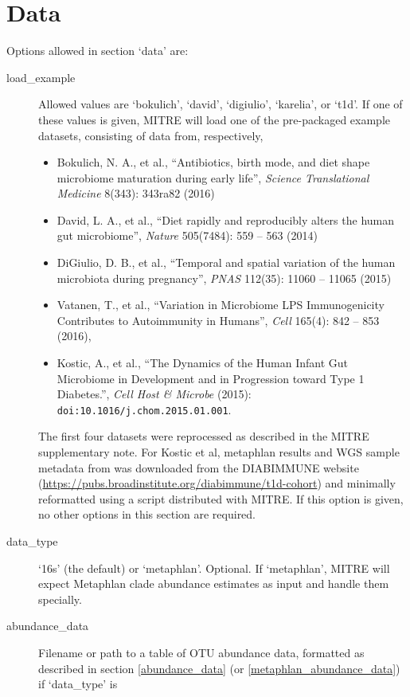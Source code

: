 \documentclass[12pt]{report}
\begin{document}
\section{Data}\label{data}
Options allowed in section `data' are:
\begin{description}
\item[load\_example] Allowed values are `bokulich', `david',
  `digiulio', `karelia', or `t1d'. If one of these values is given,
  MITRE will load one of the pre-packaged example datasets, consisting
  of data from, respectively, \begin{itemize}
  \item Bokulich, N. A., et al., ``Antibiotics, birth mode, and diet
    shape microbiome maturation during early life'', \textit{Science
      Translational Medicine} 8(343): 343ra82 (2016)
  \item David, L. A., et al., ``Diet rapidly and reproducibly alters
    the human gut microbiome'', \textit{Nature} 505(7484): 559 -- 563
    (2014)
  \item DiGiulio, D. B., et al., ``Temporal and spatial variation of
    the human microbiota during pregnancy'', \textit{PNAS} 112(35):
    11060 -- 11065 (2015)
  \item Vatanen, T., et al., ``Variation in Microbiome LPS
    Immunogenicity Contributes to Autoimmunity in Humans'',
    \textit{Cell} 165(4): 842 -- 853 (2016),
  \item Kostic, A., et al., ``The Dynamics of the Human Infant Gut
    Microbiome in Development and in Progression toward Type 1
    Diabetes.'', \textit{Cell Host \& Microbe}
    (2015): \texttt{doi:10.1016/j.chom.2015.01.001}.
\end{itemize}
  The first four datasets were reprocessed as described in the MITRE
  supplementary note. For Kostic et al, metaphlan results and WGS
  sample metadata from was downloaded from the DIABIMMUNE website
  (\url{https://pubs.broadinstitute.org/diabimmune/t1d-cohort}) and
  minimally reformatted using a script distributed with MITRE.  If
  this option is given, no other options in this section are
  required.
\item[data\_type] `16s' (the default) or `metaphlan'. Optional. If
  `metaphlan', MITRE will expect Metaphlan clade abundance estimates
  as input and handle them specially. 
\item[abundance\_data] Filename or path to a table of OTU abundance
  data, formatted as described in section \ref{abundance_data} (or
  \ref{metaphlan_abundance_data}) if `data\_type' is

\end{description}
\end{document}
